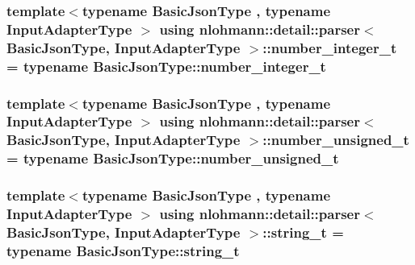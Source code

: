\subsubsection[{\texorpdfstring{number\+\_\+integer\+\_\+t}{number_integer_t}}]{\setlength{\rightskip}{0pt plus 5cm}template$<$typename Basic\+Json\+Type , typename Input\+Adapter\+Type $>$ using {\bf nlohmann\+::detail\+::parser}$<$ Basic\+Json\+Type, Input\+Adapter\+Type $>$\+::{\bf number\+\_\+integer\+\_\+t} =  typename Basic\+Json\+Type\+::number\+\_\+integer\+\_\+t\hspace{0.3cm}{\ttfamily [private]}}\hypertarget{classnlohmann_1_1detail_1_1parser_ab70e418cdc4271afd487a7d7704766c5}{}\label{classnlohmann_1_1detail_1_1parser_ab70e418cdc4271afd487a7d7704766c5}
\subsubsection[{\texorpdfstring{number\+\_\+unsigned\+\_\+t}{number_unsigned_t}}]{\setlength{\rightskip}{0pt plus 5cm}template$<$typename Basic\+Json\+Type , typename Input\+Adapter\+Type $>$ using {\bf nlohmann\+::detail\+::parser}$<$ Basic\+Json\+Type, Input\+Adapter\+Type $>$\+::{\bf number\+\_\+unsigned\+\_\+t} =  typename Basic\+Json\+Type\+::number\+\_\+unsigned\+\_\+t\hspace{0.3cm}{\ttfamily [private]}}\hypertarget{classnlohmann_1_1detail_1_1parser_a5590596704edc4a1a983e26f6f3211ff}{}\label{classnlohmann_1_1detail_1_1parser_a5590596704edc4a1a983e26f6f3211ff}
\subsubsection[{\texorpdfstring{string\+\_\+t}{string_t}}]{\setlength{\rightskip}{0pt plus 5cm}template$<$typename Basic\+Json\+Type , typename Input\+Adapter\+Type $>$ using {\bf nlohmann\+::detail\+::parser}$<$ Basic\+Json\+Type, Input\+Adapter\+Type $>$\+::{\bf string\+\_\+t} =  typename Basic\+Json\+Type\+::string\+\_\+t\hspace{0.3cm}{\ttfamily [private]}}\hypertarget{classnlohmann_1_1detail_1_1parser_a4c46f613c87af09f56679253dce768e4}{}\label{classnlohmann_1_1detail_1_1parser_a4c46f613c87af09f56679253dce768e4}

